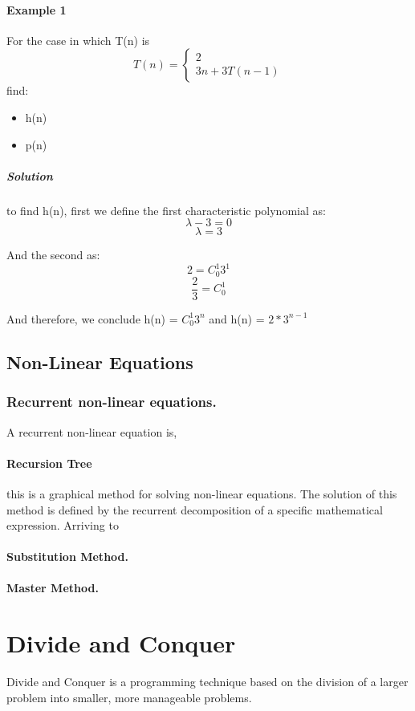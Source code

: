 \documentclass[12pt,a4paper,olive]{bbe}
\begin{document}
	\subsubsection{Example 1}
	For the case in which T(n) is
	$$ T(n) = \begin{cases} 
	2\\
	3n+3T(n-1)
	\end{cases}  $$
	find:
	\begin{itemize}
		\item h(n)
		\item p(n)
	\end{itemize}
	\paragraph*{Solution}
	to find h(n), first we define the first characteristic polynomial as:
	$$
	\lambda -3=0
	$$
	$$
	\lambda = 3
	$$

	And the second as:
	$$ 2 =  C_0^1 3^1$$
	$$ \frac{2}{3} = C_0^1 $$


	And therefore, we conclude
	h(n) = $C_0^1 3^n$ and h(n) = $2 * 3^{n-1}$
	
	\section{Non-Linear Equations}

	\subsection{Recurrent non-linear equations.}
	A recurrent non-linear equation is,

	\subsubsection{Recursion Tree}
	this is a graphical method for solving non-linear equations. The 
	solution of this method is defined by the recurrent decomposition of
	a specific mathematical expression. Arriving to 
	
	\subsubsection{Substitution Method.}

	\subsubsection{Master Method.}

	\chapter{Divide and Conquer}
	Divide and Conquer is a programming technique based on the
	division of a larger problem into smaller, more manageable
	problems.
 
\end{document}
